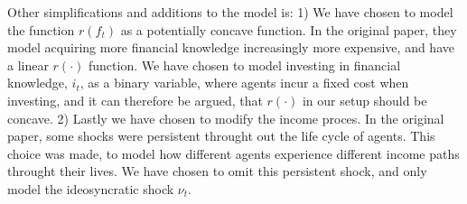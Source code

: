 Other simplifications and additions to the model is: 1) We have chosen to model the function $r(f_t)$ as a potentially concave function. In the original paper, they model acquiring more financial knowledge increasingly more expensive, and have a linear $r(\cdot)$ function. We have chosen to model investing in financial knowledge, $i_t$, as a binary variable, where agents incur a fixed cost when investing, and it can therefore be argued, that $r(\cdot)$ in our setup should be concave. 2) Lastly we have chosen to modify the income proces. In the original paper, some shocks were persistent throught out the life cycle of agents. This choice was made, to model how different agents experience different income paths throught their lives. We have chosen to omit this persistent shock, and only model the ideosyncratic shock $\nu_t$.

